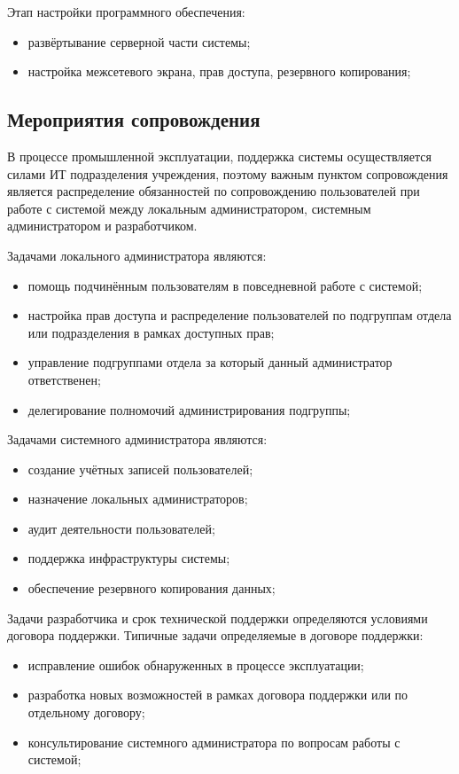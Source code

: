 \documentclass[utf8,usehyperref,12pt]{G7-32}
\begin{document}
Этап настройки программного обеспечения:
\begin{itemize}
 \item развёртывание серверной части системы;
 \item настройка межсетевого экрана, прав доступа, резервного копирования;
\end{itemize}

\subsection{Мероприятия сопровождения}

В процессе промышленной эксплуатации, поддержка системы осуществляется силами ИТ подразделения учреждения, поэтому важным пунктом сопровождения является распределение обязанностей по сопровождению пользователей при работе с системой между локальным администратором, системным администратором и разработчиком. 

Задачами локального администратора являются: 
\begin{itemize}
 \item помощь подчинённым пользователям в повседневной работе с системой;
 \item настройка прав доступа и распределение пользователей по подгруппам отдела или подразделения в рамках доступных прав;
 \item управление подгруппами отдела за который данный администратор ответственен;
 \item делегирование полномочий администрирования подгруппы;
\end{itemize}

Задачами системного администратора являются:
\begin{itemize}
 \item создание учётных записей пользователей;
 \item назначение локальных администраторов;
 \item аудит деятельности пользователей;
 \item поддержка инфраструктуры системы;
 \item обеспечение резервного копирования данных;
\end{itemize}

Задачи разработчика и срок технической поддержки определяются условиями договора поддержки. Типичные задачи определяемые в договоре поддержки:
\begin{itemize}
 \item исправление ошибок обнаруженных в процессе эксплуатации;
 \item разработка новых возможностей в рамках договора поддержки или по отдельному договору;
 \item консультирование системного администратора по вопросам работы с системой; 
\end{itemize}
\end{document}
